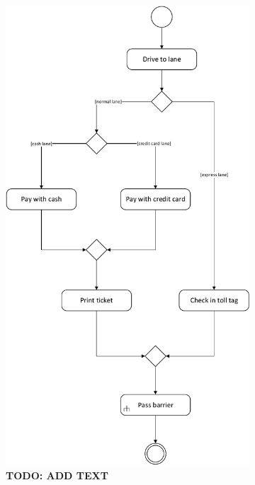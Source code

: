 \begin{figure} 
	\centering
	\begin{subfigure}[b]{0.6\textwidth}
	\includegraphics[width=\textwidth]{img/activity_diagrams/Check_In}
	\caption{\textbf{TODO: ADD TEXT}}
	\end{subfigure}
	~
	\begin{subfigure}[b]{0.3\textwidth}

\end{subfigure}
\end{figure}
